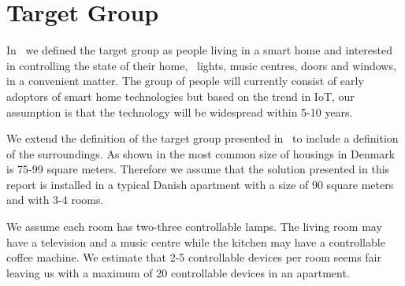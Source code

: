 \section{Target Group}
\label{sec:target-group}

In~\cite[p. 15]{prespecialisation} we defined the target group as people living in a smart home and interested in controlling the state of their home, \eg~lights, music centres, doors and windows, in a convenient matter. The group of people will currently consist of early adoptors of smart home technologies but based on the trend in IoT, our assumption is that the technology will be widespread within 5-10 years. 

We extend the definition of the target group presented in~\cite[p. 15]{prespecialisation} to include a definition of the surroundings. As shown in  the most common size of housings in Denmark is 75-99 square meters. Therefore we assume that the solution presented in this report is installed in a typical Danish apartment with a size of 90 square meters and with 3-4 rooms.

We assume each room has two-three controllable lamps. The living room may have a television and a music centre while the kitchen may have a controllable coffee machine. We estimate that 2-5 controllable devices per room seems fair leaving us with a maximum of 20 controllable devices in an apartment.

